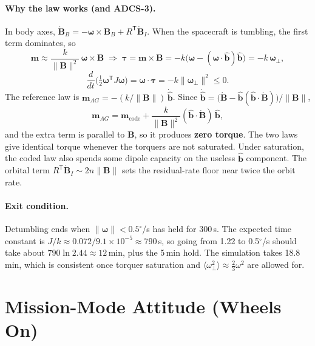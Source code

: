 \documentclass[11pt,a4paper]{article}
\newcommand{\vb}[1]{\boldsymbol{#1}}
\newcommand{\uv}[1]{\hat{\boldsymbol{#1}}}
\newcommand{\tp}{^{\mathsf{T}}}
\begin{document}
\paragraph{Why the law works (and ADCS-3).} In body axes, $\dot{\vb B}_B = -\vb\omega\times\vb B_B + R\tp\dot{\vb B}_I$. When the spacecraft is tumbling, the first term dominates, so
\begin{equation}
\vb m \approx \frac{k}{\lVert\vb B\rVert^2}\,\vb\omega\times\vb B
\;\Rightarrow\;
\vb\tau = \vb m\times\vb B = -k\big(\vb\omega - (\vb\omega\cdot\uv b)\uv b\big) = -k\,\vb\omega_\perp,
\end{equation}
\begin{equation}
\frac{d}{dt}\Big(\tfrac12\vb\omega\tp J\vb\omega\Big) = \vb\omega\cdot\vb\tau = -k\lVert\vb\omega_\perp\rVert^2 \le 0 .
\end{equation}
The reference law is $\vb m_{AG} = -(k/\lVert\vb B\rVert)\,\dot{\uv b}$. Since $\dot{\uv b} = \big(\dot{\vb B} - \uv b(\uv b\cdot\dot{\vb B})\big)/\lVert\vb B\rVert$,
\begin{equation}
\vb m_{AG} = \vb m_{\text{code}} + \frac{k}{\lVert\vb B\rVert^2}(\uv b\cdot\dot{\vb B})\,\uv b,
\end{equation}
and the extra term is parallel to $\vb B$, so it produces \textbf{zero torque}. The two laws give identical torque whenever the torquers are not saturated. Under saturation, the coded law also spends some dipole capacity on the useless $\uv b$ component. The orbital term $R\tp\dot{\vb B}_I \sim 2n\lVert\vb B\rVert$ sets the residual-rate floor near twice the orbit rate.

\paragraph{Exit condition.} Detumbling ends when $\lVert\vb\omega\rVert < 0.5^\circ$/s has held for 300\,s. The expected time constant is $J/k \approx 0.072/9.1\times10^{-5} \approx 790$\,s, so going from 1.22 to 0.5$^\circ$/s should take about $790\ln 2.44 \approx 12$\,min, plus the 5\,min hold. The simulation takes 18.8\,min, which is consistent once torquer saturation and $\langle\omega_\perp^2\rangle \approx \tfrac23\omega^2$ are allowed for.

\section{Mission-Mode Attitude (Wheels On)}\label{sec:mission}
\end{document}
